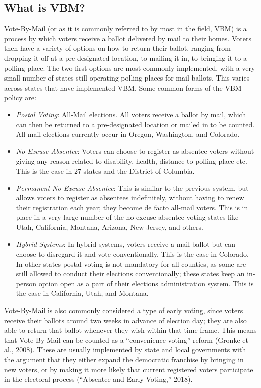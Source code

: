 \documentclass[12pt,twoside]{reedthesis}
\begin{document}
  \subsection{What is VBM?}\label{what-is-vbm}
  
  Vote-By-Mail (or as it is commonly referred to by most in the field,
  VBM) is a process by which voters receive a ballot delivered by mail to
  their homes. Voters then have a variety of options on how to return
  their ballot, ranging from dropping it off at a pre-designated location,
  to mailing it in, to bringing it to a polling place. The two first
  options are most commonly implemented, with a very small number of
  states still operating polling places for mail ballots. This varies
  across states that have implemented VBM. Some common forms of the VBM
  policy are:
  
  \begin{itemize}
  \item
    \emph{Postal Voting}: All-Mail elections. All voters receive a ballot
    by mail, which can then be returned to a pre-designated location or
    mailed in to be counted. All-mail elections currently occur in Oregon,
    Washington, and Colorado.
  \item
    \emph{No-Excuse Absentee}: Voters can choose to register as absentee
    voters without giving any reason related to disability, health,
    distance to polling place etc. This is the case in 27 states and the
    District of Columbia.
  \item
    \emph{Permanent No-Excuse Absentee}: This is similar to the previous
    system, but allows voters to register as absentees indefinitely,
    without having to renew their registration each year; they become de
    facto all-mail voters. This is in place in a very large number of the
    no-excuse absentee voting states like Utah, California, Montana,
    Arizona, New Jersey, and others.
  \item
    \emph{Hybrid Systems}: In hybrid systems, voters receive a mail ballot
    but can choose to disregard it and vote conventionally. This is the
    case in Colorado. In other states postal voting is not mandatory for
    all counties, as some are still allowed to conduct their elections
    conventionally; these states keep an in-person option open as a part
    of their elections administration system. This is the case in
    California, Utah, and Montana.
  \end{itemize}
  
  Vote-By-Mail is also commonly considered a type of early voting, since
  voters receive their ballots around two weeks in advance of election
  day; they are also able to return that ballot whenever they wish within
  that time-frame. This means that Vote-By-Mail can be counted as a
  ``convenience voting'' reform (Gronke et al., 2008). These are usually
  implemented by state and local governments with the argument that they
  either expand the democratic franchise by bringing in new voters, or by
  making it more likely that current registered voters participate in the
  electoral process (``Absentee and Early Voting,'' 2018).
  
\end{document}
